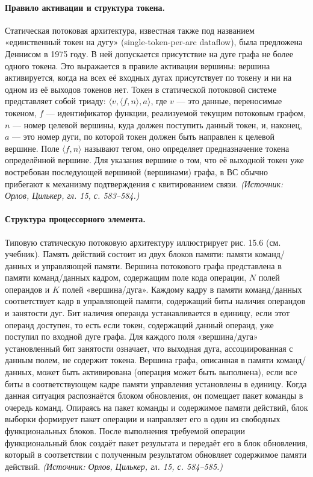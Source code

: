 \documentclass[a4paper,12pt]{article}
\begin{document}
\paragraph{Правило активации и структура токена.}
Статическая потоковая архитектура, известная также под названием «единственный токен на дугу» (single-token-per-arc dataflow), была предложена Деннисом в 1975 году. В ней допускается присутствие на дуге графа не более одного токена. Это выражается в правиле активации вершины: вершина активируется, когда на всех её входных дугах присутствует по токену и ни на одном из её выходов токенов нет. Токен в статической потоковой системе представляет собой триаду: \(\langle v, \langle f, n \rangle, a \rangle\), где \(v\) — это данные, переносимые токеном, \(f\) — идентификатор функции, реализуемой текущим потоковым графом, \(n\) — номер целевой вершины, куда должен поступить данный токен, и, наконец, \(a\) — это номер дуги, по которой токен должен быть направлен к целевой вершине. Поле \(\langle f, n \rangle\) называют тегом, оно определяет предназначение токена определённой вершине. Для указания вершине о том, что её выходной токен уже востребован последующей вершиной (вершинами) графа, в ВС обычно прибегают к механизму подтверждения с квитированием связи.
\textit{(Источник: Орлов, Цилькер, гл. 15, с. 583--584.)}

\paragraph{Структура процессорного элемента.}
Типовую статическую потоковую архитектуру иллюстрирует рис. 15.6 (см. учебник). Память действий состоит из двух блоков памяти: памяти команд/данных и управляющей памяти. Вершина потокового графа представлена в памяти команд/данных кадром, содержащим поле кода операции, \(N\) полей операндов и \(K\) полей «вершина/дуга». Каждому кадру в памяти команд/данных соответствует кадр в управляющей памяти, содержащий биты наличия операндов и занятости дуг. Бит наличия операнда устанавливается в единицу, если этот операнд доступен, то есть если токен, содержащий данный операнд, уже поступил по входной дуге графа. Для каждого поля «вершина/дуга» установленный бит занятости означает, что выходная дуга, ассоциированная с данным полем, не содержит токена. Вершина графа, описанная в памяти команд/данных, может быть активирована (операция может быть выполнена), если все биты в соответствующем кадре памяти управления установлены в единицу. Когда данная ситуация распознаётся блоком обновления, он помещает пакет команды в очередь команд. Опираясь на пакет команды и содержимое памяти действий, блок выборки формирует пакет операции и направляет его в один из свободных функциональных блоков. После выполнения требуемой операции функциональный блок создаёт пакет результата и передаёт его в блок обновления, который в соответствии с полученным результатом обновляет содержимое памяти действий.
\textit{(Источник: Орлов, Цилькер, гл. 15, с. 584--585.)}
\end{document}
